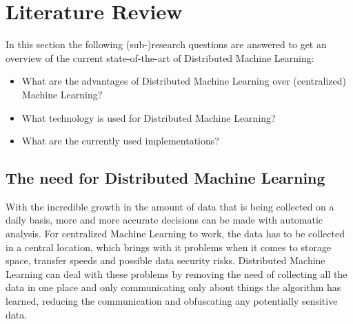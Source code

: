 \section{Literature Review}
In this section the following (sub-)research questions are answered to get an overview of the current state-of-the-art of Distributed Machine Learning:
\begin{itemize}
	\item What are the advantages of Distributed Machine Learning over (centralized) Machine Learning?
	\item What technology is used for Distributed Machine Learning?
	\item What are the currently used implementations?
\end{itemize}

\subsection{The need for Distributed Machine Learning}
With the incredible growth in the amount of data that is being collected on a daily basis, more and more accurate decisions can be made with automatic analysis. For centralized Machine Learning to work, the data has to be collected in a central location, which brings with it problems when it comes to storage space, transfer speeds and possible data security risks. Distributed Machine Learning can deal with these problems by removing the need of collecting all the data in one place and only communicating only about things the algorithm has learned, reducing the communication and obfuscating any potentially sensitive data.



